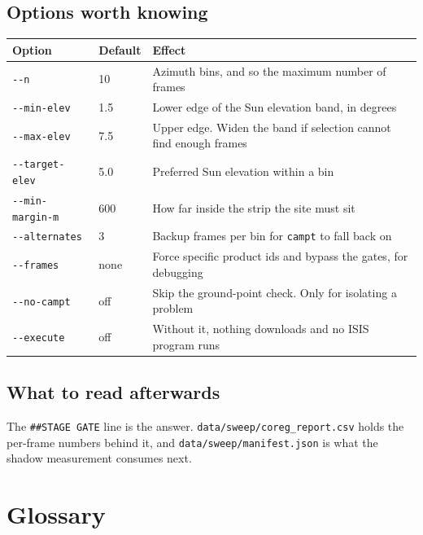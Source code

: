 \documentclass[11pt]{article}
\begin{document}
\subsection{Options worth knowing}

\begin{center}
\small
\begin{tabular}{@{}l l p{7.6cm}@{}}
\toprule
\sffamily\bfseries\color{hatinavy}Option & \sffamily\bfseries\color{hatinavy}Default
& \sffamily\bfseries\color{hatinavy}Effect \\
\midrule
\texttt{-{}-n} & 10 & Azimuth bins, and so the maximum number of frames \\
\texttt{-{}-min-elev} & 1.5 & Lower edge of the Sun elevation band, in degrees \\
\texttt{-{}-max-elev} & 7.5 & Upper edge. Widen the band if selection cannot find enough frames \\
\texttt{-{}-target-elev} & 5.0 & Preferred Sun elevation within a bin \\
\texttt{-{}-min-margin-m} & 600 & How far inside the strip the site must sit \\
\texttt{-{}-alternates} & 3 & Backup frames per bin for \texttt{campt} to fall back on \\
\texttt{-{}-frames} & none & Force specific product ids and bypass the gates, for debugging \\
\texttt{-{}-no-campt} & off & Skip the ground-point check. Only for isolating a problem \\
\texttt{-{}-execute} & off & Without it, nothing downloads and no ISIS program runs \\
\bottomrule
\end{tabular}
\end{center}

\subsection{What to read afterwards}
The \texttt{\#\#STAGE GATE} line is the answer. \texttt{data/sweep/coreg\_report.csv}
holds the per-frame numbers behind it, and \texttt{data/sweep/manifest.json} is what the
shadow measurement consumes next.

\section{Glossary}
\end{document}
